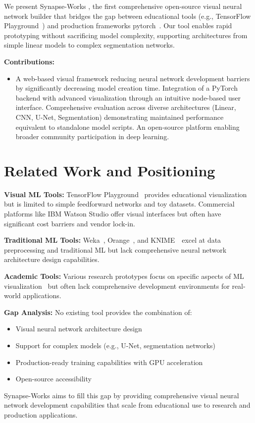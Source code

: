 \documentclass[10pt,conference]{IEEEtran}
\newcommand{\synapse}{Synapse-Works }
\begin{document}
We present \synapse, the first comprehensive open-source visual neural network
builder that bridges the gap between educational tools (e.g., TensorFlow
Playground~\cite{tensorflow_playground}) and production frameworks
pytorch~\cite{DBLP:journals/corr/abs-1912-01703}. Our tool enables rapid
prototyping without sacrificing model complexity, supporting architectures from
simple linear models to complex segmentation networks.

\textbf{Contributions:}
\begin{itemize}
    \item A web-based visual framework reducing neural network development barriers by
          significantly decreasing model creation time. Integration of a PyTorch backend
          with advanced visualization through an intuitive node-based user interface.
          Comprehensive evaluation across diverse architectures (Linear, CNN, U-Net,
          Segmentation) demonstrating maintained performance equivalent to standalone
          model scripts. An open-source platform enabling broader community participation
          in deep learning.
\end{itemize}

\section{Related Work and Positioning}
\textbf{Visual ML Tools:} TensorFlow Playground~\cite{tensorflow_playground} provides educational visualization but is limited to simple feedforward networks and toy datasets. Commercial platforms like IBM Watson Studio offer visual interfaces but often have significant cost barriers and vendor lock-in.

\textbf{Traditional ML Tools:} Weka~\cite{hall2009weka}, Orange~\cite{demsar2013orange}, and KNIME~\cite{berthold2007knime}~\cite{berthold2009knime2}excel at data preprocessing and traditional ML but lack comprehensive neural network architecture design capabilities.

\textbf{Academic Tools:} Various research prototypes focus on specific aspects of ML visualization~\cite{hohman2019summit} but often lack comprehensive development environments for real-world applications.

\textbf{Gap Analysis:} No existing tool provides the combination of:
\begin{itemize}
    \item Visual neural network architecture design
    \item Support for complex models (e.g., U-Net, segmentation networks)
    \item Production-ready training capabilities with GPU acceleration
    \item Open-source accessibility
\end{itemize}
\synapse aims to fill this gap by providing comprehensive visual neural network development capabilities that scale from educational use to research and production applications.
\end{document}
